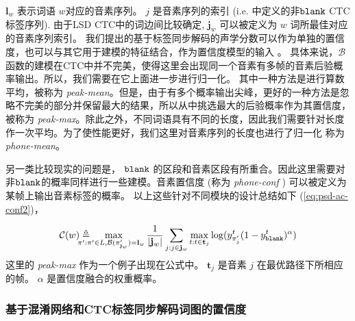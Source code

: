 $\mathbf{l}_{w}$ 表示词语  $w$对应的音素序列。
$j$ 是音素序列的索引 (i.e.  \cite{zhc00-chen-tasl2017}中定义的非$\tt blank$ CTC 标签序列).
由于LSD CTC中的词边间比较确定, $\mathbf{j}_w$ 可以被定义为 $w$ 词所最佳对应的音素序列索引。
我们提出的基于标签同步解码的声学分数可以作为单独的置信度，也可以与其它用于建模的特征结合，作为置信度模型的输入 \cite{yu2011calibration}。 
具体来说，$\mathcal{B}$函数的建模在CTC中并不完美，使得这里会出现同一个音素有多帧的音素后验概率输出。所以，我们需要在它上面进一步进行归一化。 其中一种方法是进行算数平均，被称为 {\em peak-mean}。但是，由于有多个概率输出尖峰，更好的一种方法是忽略不完美的部分并保留最大的结果，所以从中挑选最大的后验概率作为其置信度，被称为 {\em peak-max}。除此之外，不同词语具有不同的长度，因此我们需要针对长度作一次平均。为了使性能更好，我们这里对音素序列的长度也进行了归一化 称为{\em phone-mean}。

另一类比较现实的问题是， {$\tt blank$} 的区段和音素区段有所重合。因此这里需要对非$\tt blank$的概率同样进行一些建模。音素置信度 (称为 {\em phone-conf }) 可以被定义为某帧上输出音素标签的概率。
以上这些针对不同模块的设计总结如下 (\ref{eq:psd-ac-conf2})，

     \begin{equation}\label{eq:psd-ac-conf2}
        \mathcal{C}(w)
        \triangleq
        \!\!\!\!\!\!\mathop{\max}\limits
       _{\!\!\!\!\pi':\pi' \in L, \mathcal{B}(\pi'_{\mathbf{j}_w})       =       {\mathbf{l}}_w}
   \frac{1}{|\mathbf{j}_w|}\sum_{j:j\in \mathbf{j}_w}
   \max_{t:t\in\mathbf{t}_j}
   {\log(y^{t}_{\pi'_{j}}(1-y^{t}_{\tt{blank}})^\alpha)}
     \end{equation}
这里的 {\em peak-max} 作为一个例子出现在公式中。 $\mathbf{t}_j$ 是音素 $j$ 在最优路径下所相应的帧。 $\alpha$ 是置信度融合的权重概率。


\subsubsection{基于混淆网络和CTC标签同步解码词图的置信度}
\label{sec:psd-cn-conf}

